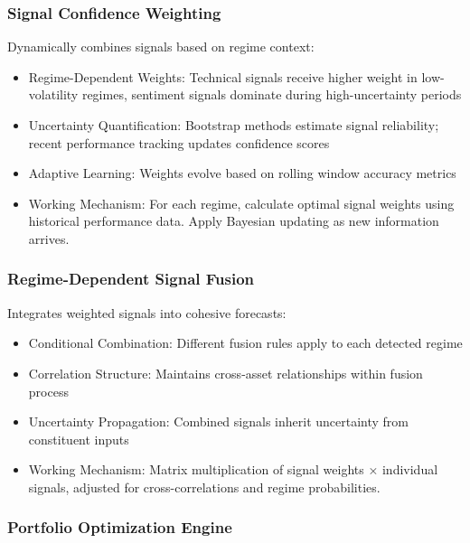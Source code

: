 \documentclass{singlecol-new}
\theoremstyle{TH}{
\newtheorem{lemma}{Lemma}
\newtheorem{theorem}[lemma]{Theorem}
\newtheorem{corrolary}[lemma]{Corrolary}
\newtheorem{conjecture}[lemma]{Conjecture}
\newtheorem{proposition}[lemma]{Proposition}
\newtheorem{claim}[lemma]{Claim}
\newtheorem{stheorem}[lemma]{Wrong Theorem}
\newtheorem{algorithm}{Algorithm}
}
\theoremstyle{THrm}{
\newtheorem{definition}{Definition}[section]
\newtheorem{question}{Question}[section]
\newtheorem{remark}{Remark}
\newtheorem{scheme}{Scheme}
}
\theoremstyle{THhit}{
\newtheorem{case}{Case}[section]
}
\begin{document}
\subsubsection{Signal Confidence Weighting}

Dynamically combines signals based on regime context:
\begin{itemize}
    \item Regime-Dependent Weights: Technical signals receive higher weight in low-volatility regimes, sentiment signals dominate during high-uncertainty periods
    \item Uncertainty Quantification: Bootstrap methods estimate signal reliability; recent performance tracking updates confidence scores
    \item Adaptive Learning: Weights evolve based on rolling window accuracy metrics
    \item Working Mechanism: For each regime, calculate optimal signal weights using historical performance data. Apply Bayesian updating as new information arrives.
\end{itemize}

\subsubsection{Regime-Dependent Signal Fusion}

Integrates weighted signals into cohesive forecasts:
\begin{itemize}
    \item Conditional Combination: Different fusion rules apply to each detected regime
    \item Correlation Structure: Maintains cross-asset relationships within fusion process
    \item Uncertainty Propagation: Combined signals inherit uncertainty from constituent inputs
    \item Working Mechanism: Matrix multiplication of signal weights × individual signals, adjusted for cross-correlations and regime probabilities.
\end{itemize}

\subsubsection{Portfolio Optimization Engine}
\end{document}
